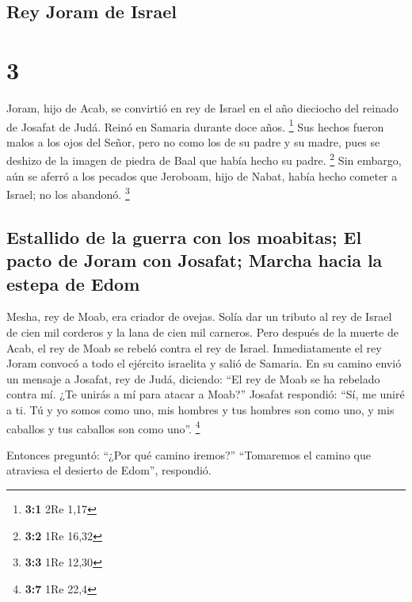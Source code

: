 \hypertarget{rey-joram-de-israel}{%
\subsection{Rey Joram de Israel}\label{rey-joram-de-israel}}

\hypertarget{section-2}{%
\section{3}\label{section-2}}

 Joram, hijo de Acab, se convirtió en rey de Israel en el
año dieciocho del reinado de Josafat de Judá. Reinó en Samaria durante
doce años. \footnote{\textbf{3:1} 2Re 1,17}  Sus hechos
fueron malos a los ojos del Señor, pero no como los de su padre y su
madre, pues se deshizo de la imagen de piedra de Baal que había hecho su
padre. \footnote{\textbf{3:2} 1Re 16,32}  Sin embargo, aún
se aferró a los pecados que Jeroboam, hijo de Nabat, había hecho cometer
a Israel; no los abandonó. \footnote{\textbf{3:3} 1Re 12,30}

\hypertarget{estallido-de-la-guerra-con-los-moabitas-el-pacto-de-joram-con-josafat-marcha-hacia-la-estepa-de-edom}{%
\subsection{Estallido de la guerra con los moabitas; El pacto de Joram
con Josafat; Marcha hacia la estepa de
Edom}\label{estallido-de-la-guerra-con-los-moabitas-el-pacto-de-joram-con-josafat-marcha-hacia-la-estepa-de-edom}}

 Mesha, rey de Moab, era criador de ovejas. Solía dar un
tributo al rey de Israel de cien mil corderos y la lana de cien mil
carneros.  Pero después de la muerte de Acab, el rey de
Moab se rebeló contra el rey de Israel.  Inmediatamente el
rey Joram convocó a todo el ejército israelita y salió de Samaria.
 En su camino envió un mensaje a Josafat, rey de Judá,
diciendo: ``El rey de Moab se ha rebelado contra mí. ¿Te unirás a mí
para atacar a Moab?'' Josafat respondió: ``Sí, me uniré a ti. Tú y yo
somos como uno, mis hombres y tus hombres son como uno, y mis caballos y
tus caballos son como uno''. \footnote{\textbf{3:7} 1Re 22,4}

 Entonces preguntó: ``¿Por qué camino iremos?''
``Tomaremos el camino que atraviesa el desierto de Edom'', respondió.

